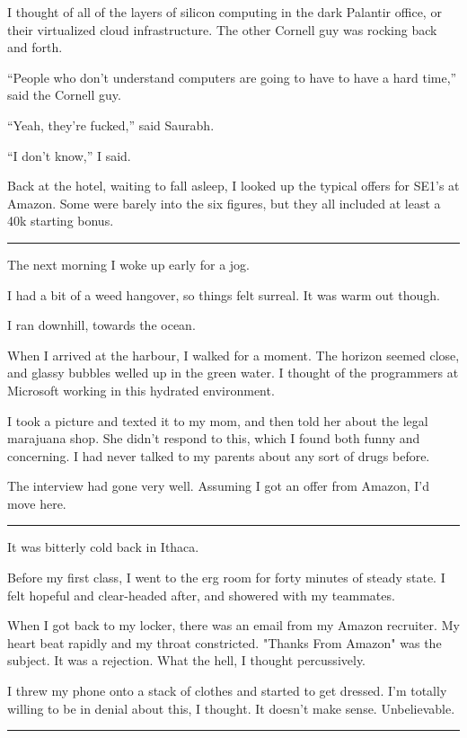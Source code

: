 I thought of all of the layers of silicon computing in the dark Palantir office,
or their virtualized cloud infrastructure.  The other Cornell guy was rocking
back and forth.

``People who don't understand computers are going to have to have a hard time,''
said the Cornell guy.

``Yeah, they're fucked,'' said Saurabh.

``I don't know,'' I said.

Back at the hotel, waiting to fall asleep, I looked up the typical offers for
SE1's at Amazon.  Some were barely into the six figures, but they all included
at least a 40k starting bonus.

\plainfancybreak{12pt}{2}{* * *}

The next morning I woke up early for a jog.

I had a bit of a weed hangover, so things felt surreal.  It was warm out though.

I ran downhill, towards the ocean.

When I arrived at the harbour, I walked for a moment.  The horizon seemed close,
and glassy bubbles welled up in the green water.  I thought of the programmers
at Microsoft working in this hydrated environment. 

I took a picture and texted it to my mom, and then told her about the legal
marajuana shop.  She didn't respond to this, which I found both funny and
concerning.  I had never talked to my parents about any sort of drugs before. 

The interview had gone very well.  Assuming I got an offer from Amazon, I'd move
here. 

\plainfancybreak{12pt}{2}{* * *}

It was bitterly cold back in Ithaca.

Before my first class, I went to the erg room for forty minutes of steady state.
I felt hopeful and clear-headed after, and showered with my teammates.

When I got back to my locker, there was an email from my Amazon recruiter.  My
heart beat rapidly and my throat constricted.  "Thanks From Amazon" was the
subject.  It was a rejection.  What the hell, I thought percussively. 

I threw my phone onto a stack of clothes and started to get dressed.  I'm
totally willing to be in denial about this, I thought.  It doesn't make sense.
Unbelievable. 

\plainfancybreak{12pt}{2}{* * *}

